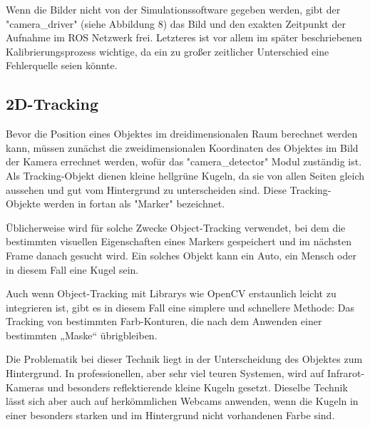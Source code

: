 \documentclass[12pt, ngerman]{article}
\begin{document}
Wenn die Bilder nicht von der Simulationssoftware gegeben werden, gibt der "camera\_driver" (siehe Abbildung 8) das Bild und den exakten Zeitpunkt der Aufnahme im ROS Netzwerk frei. Letzteres ist vor allem im später beschriebenen Kalibrierungsprozess wichtige, da ein zu großer zeitlicher Unterschied eine Fehlerquelle seien könnte.

\subsection{2D-Tracking}
Bevor die Position eines Objektes im dreidimensionalen Raum berechnet werden kann, müssen zunächst die zweidimensionalen Koordinaten des Objektes im Bild der Kamera errechnet werden, wofür das "camera\_detector" Modul zuständig ist. Als Tracking-Objekt dienen kleine hellgrüne Kugeln, da sie von allen Seiten gleich aussehen und gut vom Hintergrund zu unterscheiden sind. Diese Tracking-Objekte werden in fortan als "Marker" bezeichnet.  

Üblicherweise wird für solche Zwecke Object-Tracking verwendet, bei dem die bestimmten visuellen Eigenschaften eines Markers gespeichert und im nächsten Frame danach gesucht wird. Ein solches Objekt kann ein Auto, ein Mensch oder in diesem Fall eine Kugel sein.  

Auch wenn Object-Tracking mit Librarys wie OpenCV erstaunlich leicht zu integrieren ist, gibt es in diesem Fall eine simplere und schnellere Methode: Das Tracking von bestimmten Farb-Konturen, die nach dem Anwenden einer bestimmten „Maske“ übrigbleiben. 

Die Problematik bei dieser Technik liegt in der Unterscheidung des Objektes zum Hintergrund. In professionellen, aber sehr viel teuren Systemen, wird auf Infrarot-Kameras und besonders reflektierende kleine Kugeln gesetzt. Dieselbe Technik lässt sich aber auch auf herkömmlichen Webcams anwenden, wenn die Kugeln in einer besonders starken und im Hintergrund nicht vorhandenen Farbe sind. 
\end{document}
